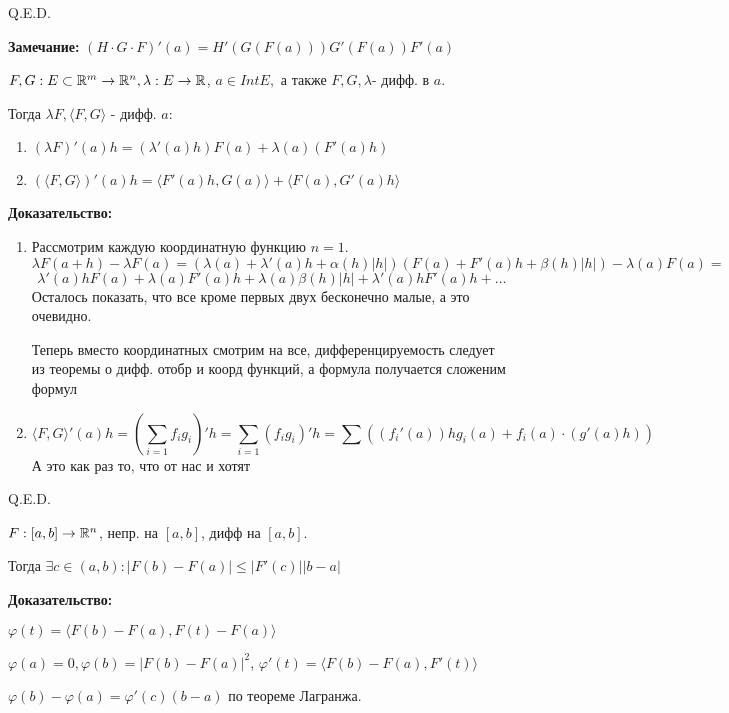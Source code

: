 \hfill Q.E.D.

\textbf{Замечание:} $(H \cdot G \cdot F)'(a) = H'(G(F(a)))G'(F(a))F'(a)$


$F, G: E \subset \mathbb{R}^m \rightarrow \mathbb{R}^n, \lambda : E \rightarrow \mathbb{R}$, $a \in Int E,$ а также $F,G,\lambda$- дифф. в $a$.

Тогда $\lambda F, \langle F,G\rangle$ - дифф. $a$:
\begin{enumerate}
    \item $(\lambda F)'(a)h = (\lambda'(a)h)F(a) + \lambda(a)(F'(a)h)$
    \item $(\langle F, G\rangle)'(a)h = \langle F'(a)h, G(a)\rangle + \langle F(a),G'(a)h\rangle$
\end{enumerate}
\textbf{Доказательство:}

\begin{enumerate}
    \item 

Рассмотрим каждую координатную функцию $n=1$.
$$\lambda F(a + h) - \lambda F(a) = (\lambda(a) + \lambda '(a)h + \alpha(h)|h|)(F(a) + F'(a)h + \beta(h)|h|) - \lambda(a)F(a) = $$
$$\lambda'(a)hF(a) + \lambda(a)F'(a)h + \lambda(a) \beta(h)|h| + \lambda'(a)hF'(a)h + \ldots$$
Осталось показать, что все кроме первых двух бесконечно малые, а это очевидно.

Теперь вместо координатных смотрим на все, дифференцируемость следует из теоремы о дифф. отобр и коорд функций, а формула получается сложеним формул

    \item $$\langle F,G\rangle'(a)h = (\sum\limits_{i=1}f_ig_i)'h = \sum\limits_{i=1}(f_ig_i)'h = \sum\limits_{}((f_i'(a))hg_i(a) + f_i(a)\cdot(g'(a)h))$$
    А это как раз то, что от нас и хотят
\end{enumerate}
\hfill Q.E.D.



$F:[a,b] \rightarrow \mathbb{R}^n$, непр. на $[a,b]$, дифф на $[a,b]$.

Тогда $\exists c \in (a,b): |F(b) -F(a)|\leq|F'(c)||b-a|$

\textbf{Доказательство:}

$\varphi(t) = \langle F(b)-F(a), F(t) -F(a)\rangle$

$\varphi(a) = 0, \varphi(b) = |F(b)-F(a)|^2$, $\varphi'(t) = \langle F(b)-F(a),F'(t)\rangle$

$\varphi(b) - \varphi(a) = \varphi'(c) (b-a)$ по теореме Лагранжа.

